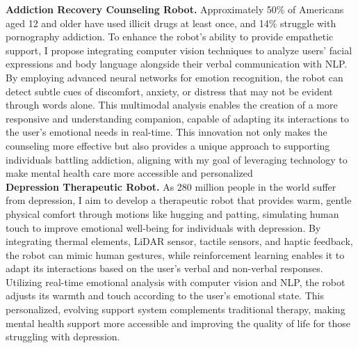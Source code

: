 \documentclass{article}
\begin{document}
\textbf{Addiction Recovery Counseling Robot.} Approximately 50\% of Americans aged 12 and older have used illicit drugs at least once, and 14\% struggle with pornography addiction. To enhance the robot's ability to provide empathetic support, I propose integrating computer vision techniques to analyze users' facial expressions and body language alongside their verbal communication with NLP. By employing advanced neural networks for emotion recognition, the robot can detect subtle cues of discomfort, anxiety, or distress that may not be evident through words alone. This multimodal analysis enables the creation of a more responsive and understanding companion, capable of adapting its interactions to the user's emotional needs in real-time. This innovation not only makes the counseling more effective but also provides a unique approach to supporting individuals battling addiction, aligning with my goal of leveraging technology to make mental health care more accessible and personalized
\\

\textbf{Depression Therapeutic Robot.} As 280 million people in the world suffer from depression, I aim to develop a therapeutic robot that provides warm, gentle physical comfort through motions like hugging and patting, simulating human touch to improve emotional well-being for individuals with depression. By integrating thermal elements, LiDAR sensor, tactile sensors, and haptic feedback, the robot can mimic human gestures, while reinforcement learning enables it to adapt its interactions based on the user's verbal and non-verbal responses. Utilizing real-time emotional analysis with computer vision and NLP, the robot adjusts its warmth and touch according to the user's emotional state. This personalized, evolving support system complements traditional therapy, making mental health support more accessible and improving the quality of life for those struggling with depression.
\\
\end{document}
